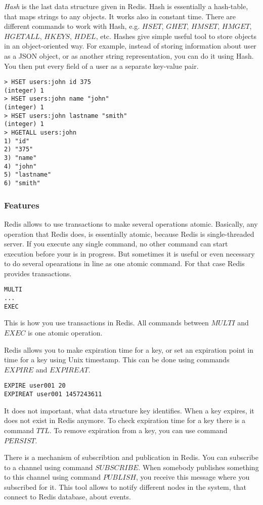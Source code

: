 \textit{Hash} is the last data structure given in Redis.
Hash is essentially a hash-table, that maps strings to any objects.
It works also in constant time.
There are different commands to work with Hash, e.g. $HSET$, $GHET$, $HMSET$, $HMGET$, $HGETALL$, $HKEYS$, $HDEL$, etc.
Hashes give simple useful tool to store objects in an object-oriented way.
For example, instead of storing information about user as a JSON object, or as another string representation, you can do it using Hash.
You then put every field of a user as a separate key-value pair.
\begin{verbatim}
> HSET users:john id 375
(integer) 1
> HSET users:john name "john"
(integer) 1
> HSET users:john lastname "smith"
(integer) 1
> HGETALL users:john
1) "id"
2) "375"
3) "name"
4) "john"
5) "lastname"
6) "smith"
\end{verbatim}

\subsubsection{Features}

Redis allows to use transactions to make several operations atomic.
Basically, any operation that Redis does, is essentially atomic, because Redis is single-threaded server.
If you execute any single command, no other command can start execution before your is in progress.
But sometimes it is useful or even necessary to do several opearations in line as one atomic command.
For that case Redis provides transactions.
\begin{verbatim}
MULTI
...
EXEC
\end{verbatim}
This is how you use transactions in Redis.
All commands between $MULTI$ and $EXEC$ is one atomic operation.

Redis allows you to make expiration time for a key, or set an expiration point in time for a key using Unix timestamp.
This can be done using commands $EXPIRE$ and $EXPIREAT$.
\begin{verbatim}
EXPIRE user001 20
EXPIREAT user001 1457243611
\end{verbatim}
It does not important, what data structure key identifies.
When a key expires, it does not exist in Redis anymore.
To check expiration time for a key there is a command $TTL$.
To remove expiration from a key, you can use command $PERSIST$.

There is a mechanism of subscribtion and publication in Redis.
You can subscribe to a channel using command $SUBSCRIBE$.
When somebody publishes something to this channel using command $PUBLISH$, you receive this message where you subscribed for it.
This tool allows to notify different nodes in the system, that connect to Redis database, about events.

